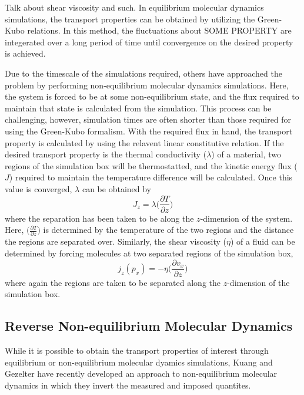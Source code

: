 Talk about shear viscosity and such.  In equilibrium molecular
dynamics simulations, the transport properties can be obtained by
utilizing the Green-Kubo relations. In this method, the fluctuations
about SOME PROPERTY are integerated over a long period of time until
convergence on the desired property is achieved. 

Due to the timescale of the simulations required, others have
approached the problem by performing non-equilibrium molecular
dynamics simulations. Here, the system is forced to be at some
non-equilibrium state, and the flux required to maintain that state is
calculated from the simulation. This process can be challenging,
however, simulation times are often shorter than those required for
using the Green-Kubo formalism. With the required flux in hand, the
transport property is calculated by using the relavent linear
constitutive relation. If the desired transport property is the
thermal conductivity ($\lambda$) of a material, two regions of the simulation box
will be thermostatted, and the kinetic energy flux ($J$) required to
maintain the temperature difference will be calculated. Once this
value is converged, $\lambda$ can be obtained by 
\begin{equation}\label{thermalTransport}
J_{z} = \lambda \big(\frac{\partial T}{\partial z}\big)
\end{equation}
where the separation has been taken to be along the $z$-dimension of
the system.  Here, $\big(\frac{\partial T}{\partial z}\big) $ is
determined by the temperature of the two regions and the distance the
regions are separated over. Similarly, the shear viscosity
($\eta$) of a fluid can be determined by forcing molecules at two
separated regions of the simulation box,
\begin{equation}\label{momentumTransport}
  j_{z}(p_{x}) = -\eta \big(\frac{\partial v_{x}}{\partial z}\big)
\end{equation}
where again the regions are taken to be separated along the
$z$-dimension of the simulation box.

\subsection{Reverse Non-equilibrium Molecular Dynamics}
While it is possible to obtain the transport properties of interest
through equilibrium or non-equilibrium molecular dyamics simulations,
Kuang and Gezelter have recently developed an approach to
non-equilibrium molecular dynamics in which they invert the measured
and imposed quantites. 


